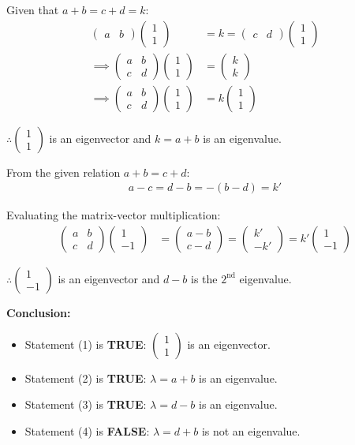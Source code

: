\documentclass[journal,12pt,onecolumn]{IEEEtran}
\newcommand{\brak}[1]{\left(#1\right)}
\newcommand{\myvec}[1]{\begin{pmatrix}#1\end{pmatrix}}
\theoremstyle{remark}
\begin{document}
\noindent Given that $a + b = c + d = k$:
\begin{align}
\myvec{ a & b } \myvec{ 1 \\ 1 } &= k = \myvec{ c & d } \myvec{ 1 \\ 1 } \\
\implies \myvec{ a & b \\ c & d } \myvec{ 1 \\ 1 } &= \myvec{ k \\ k } \\
\implies \myvec{ a & b \\ c & d } \myvec{ 1 \\ 1 } &= k \myvec{ 1 \\ 1 }
\end{align}

\noindent $\therefore \myvec{ 1 \\ 1 }$ is an eigenvector and $k = a + b$ is an eigenvalue.

\vspace{0.5cm}


\noindent From the given relation $a + b = c + d$:
\begin{align}
a - c = d - b = -\brak{b - d} = k'
\end{align}

\noindent Evaluating the matrix-vector multiplication:
\begin{align}
\myvec{ a & b \\ c & d } \myvec{ 1 \\ -1 } &= \myvec{ a - b \\ c - d } = \myvec{ k' \\ -k' } = k' \myvec{ 1 \\ -1 }
\end{align}

\noindent $\therefore \myvec{ 1 \\ -1 }$ is an eigenvector and $d - b$ is the $2^{\text{nd}}$ eigenvalue.

\vspace{0.5cm}

\noindent \textbf{Conclusion:}
\begin{itemize}
    \item Statement (1) is \textbf{TRUE}: $\myvec{ 1 \\ 1 }$ is an eigenvector.
    \item Statement (2) is \textbf{TRUE}: $\lambda = a + b$ is an eigenvalue.
    \item Statement (3) is \textbf{TRUE}: $\lambda = d - b$ is an eigenvalue.
    \item Statement (4) is \textbf{FALSE}: $\lambda = d + b$ is not an eigenvalue.
\end{itemize}
\end{document}
